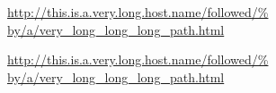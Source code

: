 \documentclass[a5paper]{article}
\begin{document}
\raggedright

\url{http://this.is.a.very.long.host.name/followed/%
by/a/very_long_long_long_path.html}%

\sbox{}%
\unhbox\testbox

\begin{setouterhbox}{\testbox}%
  \url{http://this.is.a.very.long.host.name/followed/%
  by/a/very_long_long_long_path.html}%
\end{setouterhbox}
\unhbox\testbox
\end{document}
